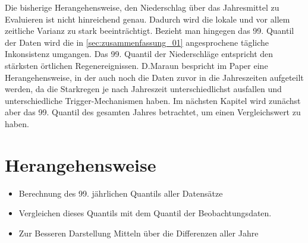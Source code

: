 Die bisherige Herangehensweise, den Niederschlag über das Jahresmittel zu Evaluieren ist nicht hinreichend genau. Dadurch wird die lokale und vor allem zeitliche Varianz zu stark beeinträchtigt. Bezieht man hingegen das 99. Quantil der Daten wird die in \ref{sec:zusammenfassung_01} angesprochene tägliche Inkonsistenz umgangen. Das 99. Quantil der Niederschläge entspricht den stärksten örtlichen Regenereignissen. D.Maraun bespricht im Paper \cite{biasMaraun} eine Herangehensweise, in der auch noch die Daten zuvor in die Jahreszeiten aufgeteilt werden, da die Starkregen je nach Jahreszeit unterschiedlichst ausfallen und unterschiedliche Trigger-Mechanismen haben. Im nächsten Kapitel wird zunächst aber das 99. Quantil des gesamten Jahres betrachtet, um einen Vergleichswert zu haben.
\section{Herangehensweise}
\begin{itemize}
	\item Berechnung des 99. jährlichen Quantils aller Datensätze
	\item Vergleichen dieses Quantils mit dem Quantil der Beobachtungsdaten.
	\item Zur Besseren Darstellung Mitteln über die Differenzen aller Jahre
\end{itemize}

